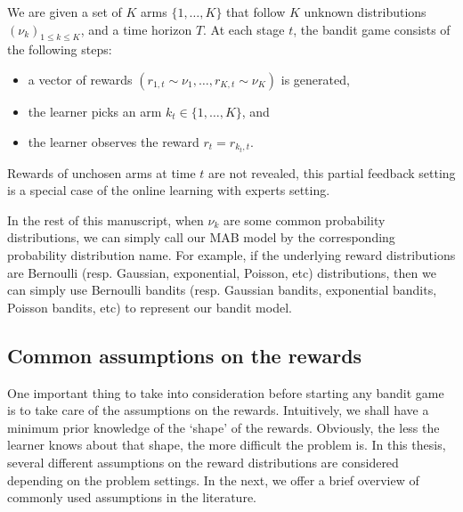 \begin{definition}\label{def:mab.mab}
\begin{leftbar}[defnbar]
	We are given a set of $K$ arms $\{1,\ldots,K\}$ that follow $K$ unknown distributions $(\nu_k)_{1 \leq k \leq K}$, and a time horizon $T$. At each stage $t$, the bandit game consists of the following steps:
	\begin{itemize}
		\item a vector of rewards $(r_{1,t} \sim \nu_1, \ldots, r_{K,t} \sim \nu_K)$ is generated,
		\item the learner picks an arm $k_t \in \{1,\ldots,K\}$, and
		\item the learner observes the reward $r_t = r_{k_t, t}$.
	\end{itemize}
\end{leftbar}
\end{definition}

\begin{remark}\label{remark:mab.partial}
\begin{leftbar}[remarkbar]
	Rewards of unchosen arms at time $t$ are not revealed, this partial feedback setting is a special case of the online learning with experts setting.
\end{leftbar}
\end{remark}

In the rest of this manuscript, when $\nu_k$ are some common probability distributions, we can simply call our MAB model by the corresponding probability distribution name. For example, if the underlying reward distributions are Bernoulli (resp. Gaussian, exponential, Poisson, etc) distributions, then we can simply use Bernoulli bandits (resp. Gaussian bandits, exponential bandits, Poisson bandits, etc) to represent our bandit model. 

\subsection{Common assumptions on the rewards}\label{sec:mab.model.assumptions}

One important thing to take into consideration before starting any bandit game is to take care of the assumptions on the rewards. Intuitively, we shall have a minimum prior knowledge of the `shape' of the rewards. Obviously, the less the learner knows about that shape, the more difficult the problem is. In this thesis, several different assumptions on the reward distributions are considered depending on the problem settings. In the next, we offer a brief overview of commonly used assumptions in the literature.


